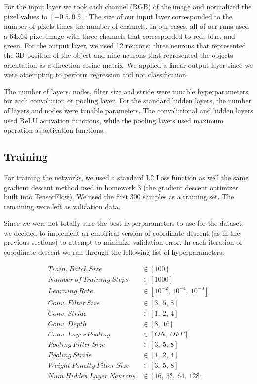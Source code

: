 \documentclass[journal]{IEEEtran}
\begin{document}
For the input layer we took each channel (RGB) of the image and normalized the pixel values to $[-0.5,  0.5]$. The size of our input layer corresponded to the number of pixels times the number of channels. In our cases, all of our runs used a 64x64 pixel image with three channels that corresponded to red, blue, and green. For the output layer, we used 12 neurons; three neurons that represented the 3D position of the object and nine neurons that represented the objects orientation as a direction cosine matrix. We applied a linear output layer since we were attempting to perform regression and not classification. 

The number of layers, nodes, filter size and stride were tunable hyperparameters for each convolution or pooling layer. For the standard hidden layers, the number of layers and nodes were tunable parameters. The convolutional and hidden layers used ReLU activation functions, while the pooling layers used maximum operation as activation functions. 



\subsection{Training}
For training the networks, we used a standard L2 Loss function as well the same gradient descent method used in homework 3 (the gradient descent optimizer built into TensorFlow). We used the first 300 samples as a training set. The remaining were left as validation data. 

Since we were not totally sure the best hyperparameters to use for the dataset, we decided to implement an empirical version of coordinate descent (as in the previous sections) to attempt to minimize validation error. 
In each iteration of coordinate descent we ran through the following list of hyperparameters:


\begin{align*}
Train.\ Batch\ Size  &\in [100]\\
Number\ of\ Training\ Steps  &\in [1000]\\
Learning\ Rate &\in [10^{-2},\ 10^{-4},\ 10^{-8}]\\
Conv.\ Filter\ Size &\in [3,\ 5,\ 8]\\
Conv.\ Stride &\in [1,\ 2,\ 4]\\
Conv.\ Depth &\in [8,\ 16]\\
Conv.\ Layer\ Pooling\  &\in [ON,\ OFF]\\
Pooling\ Filter\ Size &\in [3,\ 5,\ 8]\\
Pooling\ Stride &\in [1,\ 2,\ 4]\\
Weight\ Penalty\ Filter\ Size &\in [3,\ 5,\ 8]\\
Num\ Hidden\ Layer\ Neurons &\in [16,\ 32,\ 64,\ 128]\\
\end{align*}
\end{document}
